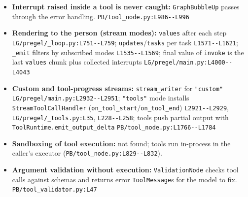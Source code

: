 \begin{itemize}
\item \textbf{Interrupt raised inside a tool is never caught:} \texttt{GraphBubbleUp} passes through the error handling. \texttt{PB/\allowbreak{}tool\_\allowbreak{}node.\allowbreak{}py:\allowbreak{}L986-\allowbreak{}-\allowbreak{}L996}
\item \textbf{Rendering to the person (stream modes):} \texttt{values} after each step \texttt{LG/\allowbreak{}pregel/\allowbreak{}\_\allowbreak{}loop.\allowbreak{}py:\allowbreak{}L751-\allowbreak{}-\allowbreak{}L759}; \texttt{updates}/\texttt{tasks} per task \texttt{L1571-\allowbreak{}-\allowbreak{}L1621}; \texttt{\_\allowbreak{}emit} filters by subscribed modes \texttt{L1535-\allowbreak{}-\allowbreak{}L1569}; final value of \texttt{invoke} is the last \texttt{values} chunk plus collected interrupts \texttt{LG/\allowbreak{}pregel/\allowbreak{}main.\allowbreak{}py:\allowbreak{}L4000-\allowbreak{}-\allowbreak{}L4043}
\item \textbf{Custom and tool-progress streams:} \texttt{stream\_\allowbreak{}writer} for \texttt{"custom"} \texttt{LG/\allowbreak{}pregel/\allowbreak{}main.\allowbreak{}py:\allowbreak{}L2932-\allowbreak{}-\allowbreak{}L2951}; \texttt{"tools"} mode installs \texttt{StreamToolCallHandler} (\texttt{on\_\allowbreak{}tool\_\allowbreak{}start}/\texttt{on\_\allowbreak{}tool\_\allowbreak{}end}) \texttt{L2921-\allowbreak{}-\allowbreak{}L2929}, \texttt{LG/\allowbreak{}pregel/\allowbreak{}\_\allowbreak{}tools.\allowbreak{}py:\allowbreak{}L35}, \texttt{L228-\allowbreak{}-\allowbreak{}L258}; tools push partial output with \texttt{ToolRuntime.\allowbreak{}emit\_\allowbreak{}output\_\allowbreak{}delta} \texttt{PB/\allowbreak{}tool\_\allowbreak{}node.\allowbreak{}py:\allowbreak{}L1766-\allowbreak{}-\allowbreak{}L1784}
\item \textbf{Sandboxing of tool execution:} not found; tools run in-process in the caller's executor (\texttt{PB/\allowbreak{}tool\_\allowbreak{}node.\allowbreak{}py:\allowbreak{}L829-\allowbreak{}-\allowbreak{}L832}).
\item \textbf{Argument validation without execution:} \texttt{ValidationNode} checks tool calls against schemas and returns error \texttt{ToolMessage}s for the model to fix. \texttt{PB/\allowbreak{}tool\_\allowbreak{}validator.\allowbreak{}py:\allowbreak{}L47}
\end{itemize}

